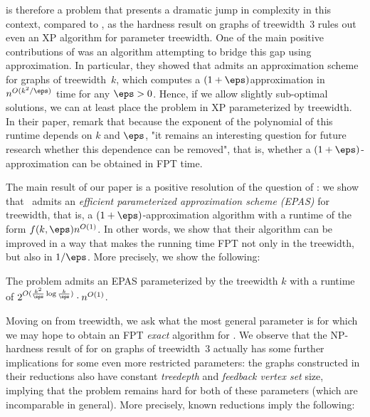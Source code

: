 \SF is therefore a problem that presents a dramatic jump in complexity in this
context, compared to \ST, as the hardness result on graphs of treewidth~$3$
rules out even an XP algorithm for parameter treewidth. One of the main
positive contributions of \citet{bateni2011approximation} was an algorithm
attempting to bridge this gap using approximation. In particular, they showed
that \SF admits an approximation scheme for graphs of treewidth~$k$, which
computes a $(1+\eps)$\hy{}approximation in $n^{O(k^2/\eps)}$ time for any $\eps>0$. Hence, if we
allow slightly sub-optimal solutions, we can at least place the problem in XP
parameterized by treewidth. In their paper, \citet{bateni2011approximation}
remark that because the exponent of the polynomial of this runtime depends on
$k$ and $\eps$, "it remains an interesting question for future research whether
this dependence can be removed", that is, whether a $(1+\eps)$-approximation
can be obtained in FPT time.

The main result of our paper is a positive resolution of the question of
\citet{bateni2011approximation}: we show that \SF\ admits an \emph{efficient
parameterized approximation scheme (EPAS)} for treewidth, that is, a
$(1+\eps)$-approximation algorithm with a runtime of the form
$f(k,\eps)n^{O(1)}$. In other words, we show that their algorithm can be
improved in a way that makes the running time FPT not only in the treewidth,
but also in $1/\eps$. More precisely, we show the following:



\begin{theorem}\label{thm:tw-EPAS}
The \SF problem admits an EPAS parameterized by the treewidth $k$ with a runtime of $2^{O(\frac{k^2}{\eps}\log\frac{k}{\eps})}\cdot n^{O(1)}$.
\end{theorem}


%

Moving on from treewidth, we ask what the most general
parameter is for which we may hope to obtain an FPT \emph{exact} algorithm for
\SF. We observe that the NP-hardness result of \citet{gassner2010steiner,
bateni2011approximation} for \SF on graphs of treewidth~$3$ actually has some
further implications for some even more restricted parameters: the graphs
constructed in their reductions also have constant \emph{treedepth} and
\emph{feedback vertex set} size, implying that the problem remains hard for
both of these parameters (which are incomparable in general). More
precisely, known reductions imply the following:


